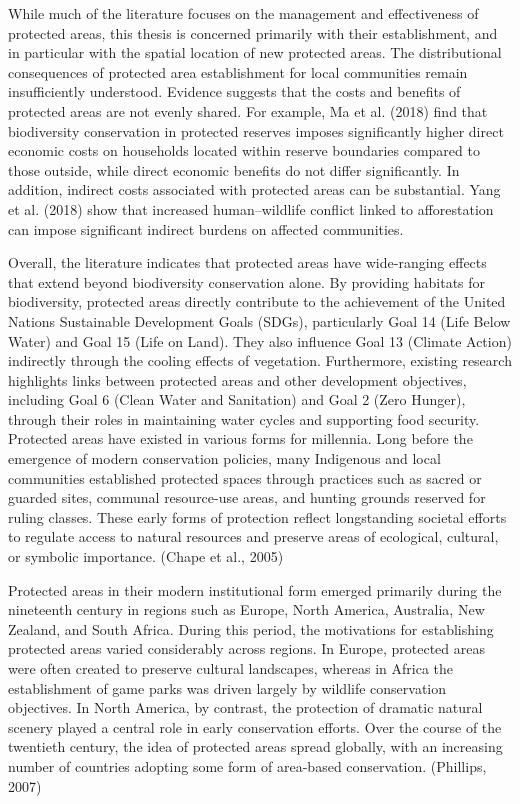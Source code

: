 \documentclass[12pt]{article}
\theoremstyle{break} %
\begin{document}
While much of the literature focuses on the management and effectiveness of protected areas, this thesis is concerned primarily with their establishment, and in particular with the spatial location of new protected areas. The distributional consequences of protected area establishment for local communities remain insufficiently understood. Evidence suggests that the costs and benefits of protected areas are not evenly shared. For example, Ma et al. (2018) find that biodiversity conservation in protected reserves imposes significantly higher direct economic costs on households located within reserve boundaries compared to those outside, while direct economic benefits do not differ significantly. In addition, indirect costs associated with protected areas can be substantial. Yang et al. (2018) show that increased human–wildlife conflict linked to afforestation can impose significant indirect burdens on affected communities.

Overall, the literature indicates that protected areas have wide-ranging effects that extend beyond biodiversity conservation alone. By providing habitats for biodiversity, protected areas directly contribute to the achievement of the United Nations Sustainable Development Goals (SDGs), particularly Goal 14 (Life Below Water) and Goal 15 (Life on Land). They also influence Goal 13 (Climate Action) indirectly through the cooling effects of vegetation. Furthermore, existing research highlights links between protected areas and other development objectives, including Goal 6 (Clean Water and Sanitation) and Goal 2 (Zero Hunger), through their roles in maintaining water cycles and supporting food security.
\newline \newline
Protected areas have existed in various forms for millennia. Long before the emergence of modern conservation policies, many Indigenous and local communities established protected spaces through practices such as sacred or guarded sites, communal resource-use areas, and hunting grounds reserved for ruling classes. These early forms of protection reflect longstanding societal efforts to regulate access to natural resources and preserve areas of ecological, cultural, or symbolic importance. (Chape et al., 2005)

Protected areas in their modern institutional form emerged primarily during the nineteenth century in regions such as Europe, North America, Australia, New Zealand, and South Africa. During this period, the motivations for establishing protected areas varied considerably across regions. In Europe, protected areas were often created to preserve cultural landscapes, whereas in Africa the establishment of game parks was driven largely by wildlife conservation objectives. In North America, by contrast, the protection of dramatic natural scenery played a central role in early conservation efforts. Over the course of the twentieth century, the idea of protected areas spread globally, with an increasing number of countries adopting some form of area-based conservation. (Phillips, 2007)
\end{document}

